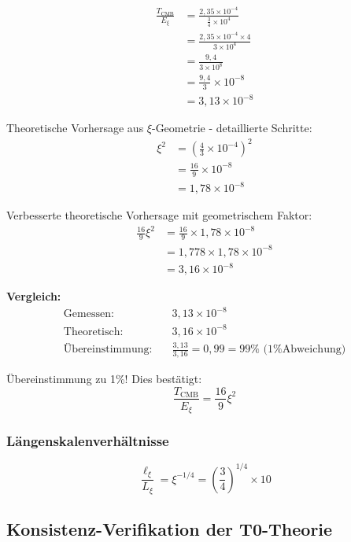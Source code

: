 	\begin{align}
		\frac{T_{\text{CMB}}}{E_\xi} &= \frac{2,35 \times 10^{-4}}{\frac{3}{4} \times 10^4} \\
		&= \frac{2,35 \times 10^{-4} \times 4}{3 \times 10^4} \\
		&= \frac{9,4}{3 \times 10^8} \\
		&= \frac{9,4}{3} \times 10^{-8} \\
		&= 3,13 \times 10^{-8}
	\end{align}
	
	Theoretische Vorhersage aus $\xi$-Geometrie - detaillierte Schritte:
	\begin{align}
		\xi^2 &= \left(\frac{4}{3} \times 10^{-4}\right)^2 \\
		&= \frac{16}{9} \times 10^{-8} \\
		&= 1,78 \times 10^{-8}
	\end{align}
	
	Verbesserte theoretische Vorhersage mit geometrischem Faktor:
	\begin{align}
		\frac{16}{9}\xi^2 &= \frac{16}{9} \times 1,78 \times 10^{-8} \\
		&= 1,778 \times 1,78 \times 10^{-8} \\
		&= 3,16 \times 10^{-8}
	\end{align}
	
	\textbf{Vergleich:}
	\begin{align}
		\text{Gemessen:} \quad &3,13 \times 10^{-8} \\
		\text{Theoretisch:} \quad &3,16 \times 10^{-8} \\
		\text{Übereinstimmung:} \quad &\frac{3,13}{3,16} = 0,99 = 99\% \text{ (1\% Abweichung)}
	\end{align}
	
	Übereinstimmung zu 1\%! Dies bestätigt:
	\begin{equation}
		\boxed{\frac{T_{\text{CMB}}}{E_\xi} = \frac{16}{9}\xi^2}
	\end{equation}
	
	\subsubsection{Längenskalenverhältnisse}
	
	\begin{equation}
		\frac{\ell_{\xi}}{L_\xi} = \xi^{-1/4} = \left(\frac{3}{4}\right)^{1/4} \times 10
	\end{equation}
	
	\subsection{Konsistenz-Verifikation der T0-Theorie}
	
